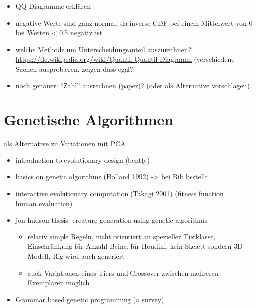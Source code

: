  \begin{itemize}
  \item QQ Diagramme erklären
  \item negative Werte sind ganz normal, da inverse CDF bei einem Mittelwert von 0 bei Werten < 0.5 negativ ist
  \item welche Methode um Unterscheidungsanteil auszurechnen? \url{https://de.wikipedia.org/wiki/Quantil-Quantil-Diagramm} (verschiedene Sachen ausprobieren, zeigen dass egal?
  \item noch genauer: "`Zahl"' ausrechnen (paper)? (oder als Alternative vorschlagen)
 \end{itemize}


\section{Genetische Algorithmen}

als Alternative zu Variationen mit PCA

\begin{itemize}
 \item introduction to evolutionary design (bently)
 \item basics on genetic algorithms (Holland 1992) -> bei Bib bestellt
 \item interactive evolutionary computation (Takagi 2001) (fitness function = human evaluation)
 \item jon hudson thesis: creature generation using genetic algorithms \cite{JonHudson}
   \begin{itemize}
    \item relativ simple Regeln, nicht orientiert an spezieller Tierklasse, Einschränkung für Anzahl Beine, für Houdini, kein Skelett sondern 3D-Modell, Rig wird auch generiert
    \item auch Variationen eines Tiers und Crossover zwischen mehreren Exemplaren möglich
   \end{itemize}
  \item Grammar based genetic programming (a survey) 
\end{itemize}


